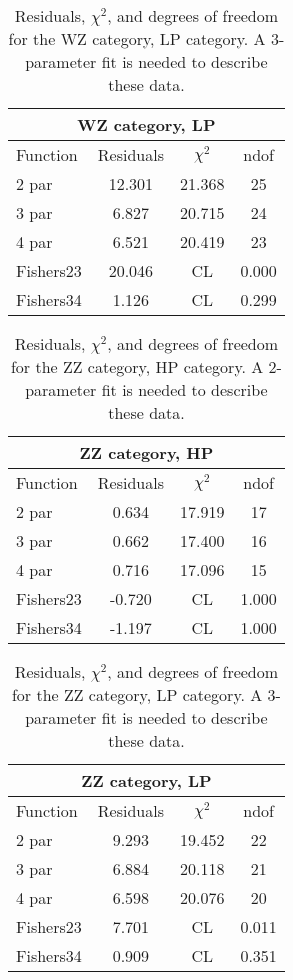 \begin{table}[htb]
\centering
\begin{tabular}{|l c c c |}
\hline
\multicolumn{4}{|c|}{WZ category, LP}\\
\hline
Function & Residuals & $\chi^2$ & ndof \\
\hline
2 par & 12.301 & 21.368 & 25 \\
3 par & 6.827 & 20.715 & 24 \\
4 par & 6.521 & 20.419 & 23 \\
\hline
\hline
Fishers23  & 20.046 & CL & 0.000\\
Fishers34  & 1.126 & CL & 0.299\\
\hline
\end{tabular}
\caption{Residuals, $\chi^{2}$, and degrees of freedom for the WZ category, LP category. A 3-parameter fit is needed to describe these data.}
\label{tab:WZ category, LP}
\end{table}
\begin{table}[htb]
\centering
\begin{tabular}{|l c c c |}
\hline
\multicolumn{4}{|c|}{ZZ category, HP}\\
\hline
Function & Residuals & $\chi^2$ & ndof \\
\hline
2 par & 0.634 & 17.919 & 17 \\
3 par & 0.662 & 17.400 & 16 \\
4 par & 0.716 & 17.096 & 15 \\
\hline
\hline
Fishers23  & -0.720 & CL & 1.000\\
Fishers34  & -1.197 & CL & 1.000\\
\hline
\end{tabular}
\caption{Residuals, $\chi^{2}$, and degrees of freedom for the ZZ category, HP category. A 2-parameter fit is needed to describe these data.}
\label{tab:ZZ category, HP}
\end{table}
\begin{table}[htb]
\centering
\begin{tabular}{|l c c c |}
\hline
\multicolumn{4}{|c|}{ZZ category, LP}\\
\hline
Function & Residuals & $\chi^2$ & ndof \\
\hline
2 par & 9.293 & 19.452 & 22 \\
3 par & 6.884 & 20.118 & 21 \\
4 par & 6.598 & 20.076 & 20 \\
\hline
\hline
Fishers23  & 7.701 & CL & 0.011\\
Fishers34  & 0.909 & CL & 0.351\\
\hline
\end{tabular}
\caption{Residuals, $\chi^{2}$, and degrees of freedom for the ZZ category, LP category. A 3-parameter fit is needed to describe these data.}
\label{tab:ZZ category, LP}
\end{table}
